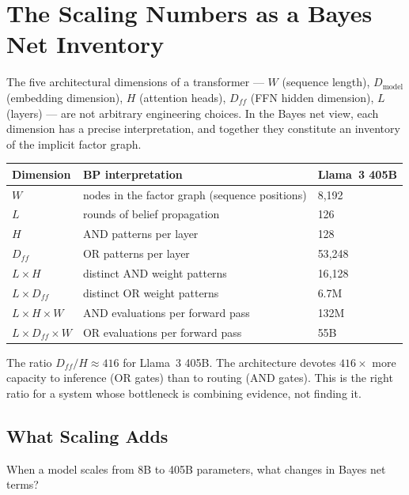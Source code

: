 \section{The Scaling Numbers as a Bayes Net Inventory}
\label{sec:scaling-numbers}

The five architectural dimensions of a transformer --- $W$ (sequence length),
$D_{\mathrm{model}}$ (embedding dimension), $H$ (attention heads), $D_{ff}$ (FFN
hidden dimension), $L$ (layers) --- are not arbitrary engineering choices. In the
Bayes net view, each dimension has a precise interpretation, and together they
constitute an inventory of the implicit factor graph.

\begin{center}
\begin{tabular}{lll}
\toprule
Dimension & BP interpretation & Llama~3 405B \\
\midrule
$W$ & nodes in the factor graph (sequence positions) & 8{,}192 \\
$L$ & rounds of belief propagation & 126 \\
$H$ & AND patterns per layer & 128 \\
$D_{ff}$ & OR patterns per layer & 53{,}248 \\
$L \times H$ & distinct AND weight patterns & 16{,}128 \\
$L \times D_{ff}$ & distinct OR weight patterns & 6.7M \\
$L \times H \times W$ & AND evaluations per forward pass & 132M \\
$L \times D_{ff} \times W$ & OR evaluations per forward pass & 55B \\
\bottomrule
\end{tabular}
\end{center}

The ratio $D_{ff} / H \approx 416$ for Llama~3 405B. The architecture devotes
$416\times$ more capacity to inference (OR gates) than to routing (AND gates).
This is the right ratio for a system whose bottleneck is combining evidence, not
finding it.

\subsection*{What Scaling Adds}

When a model scales from 8B to 405B parameters, what changes in Bayes net terms?

